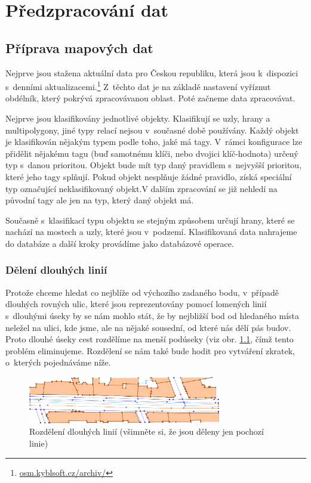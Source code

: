 \chapter{Předzpracování dat}


\section{Příprava mapových dat}
Nejprve jsou stažena aktuální data pro Českou republiku, která jsou k~dispozici
s~denními aktualizacemi.\footnote{\url{osm.kyblsoft.cz/archiv/}} Z~těchto dat je
na základě nastavení vyříznut obdélník, který pokrývá zpracovávanou oblast. Poté
začneme data zpracovávat.

Nejprve jsou klasifikovány jednotlivé objekty. Klasifikují se uzly, hrany a
multipolygony, jiné typy relací nejsou v~současné době používány. Každý objekt
je klasifikován nějakým typem podle toho, jaké má tagy. V~rámci konfigurace lze
přidělit nějakému tagu (buď samotnému klíči, nebo dvojici klíč-hodnota) určený
typ s~danou prioritou. Objekt bude mít typ daný pravidlem s~nejvyšší prioritou,
které jeho tagy splňují. Pokud objekt nesplňuje žádné pravidlo, získá speciální
typ označující neklasifikovaný objekt.V dalším zpracování se již nehledí na
původní tagy ale jen na typ, který daný objekt má.

Současně s~klasifikací typu objektu se stejným způsobem určují hrany, které se
nachází na mostech a uzly, které jsou v~podzemí. Klasifikovaná data nahrajeme do
databáze a další kroky provádíme jako databázové operace. 

\subsection{Dělení dlouhých linií}
Protože chceme hledat co nejblíže od výchozího zadaného bodu, v~případě dlouhých
rovných ulic, které jsou reprezentovány pomocí lomených linií s~dlouhými úseky
by se nám mohlo stát, že by nejbližší bod od hledaného místa neležel na ulici,
kde jsme, ale na nějaké sousední, od které nás dělí pás budov. Proto dlouhé
úseky cest rozdělíme na menší podúseky (viz obr. \ref{fig:deleni}, čímž tento problém eliminujeme.
Rozdělení se nám také bude hodit pro vytváření zkratek, o~kterých pojednáváme
níže.

\begin{figure}
  \centering
    \includegraphics[width=0.75\textwidth]{../img/deleni.pdf}
  \caption{Rozdělení dlouhých linií (všimněte si, že jsou děleny jen pochozí
  linie)}
  \label{fig:deleni}
\end{figure}

